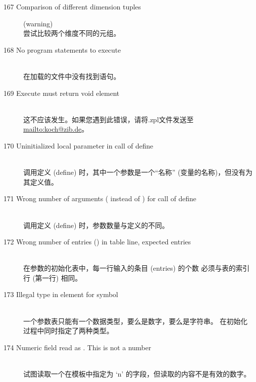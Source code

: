 \begin{description}
\item[167 Comparison of different dimension tuples] (warning)\ \\
  尝试比较两个维度不同的元组。
%
%
\item[168 No program statements to execute]\ \\
  在加载的文件中没有找到\zimpl 语句。
%
%
\item[169 Execute must return void element]\ \\
  这不应该发生。如果您遇到此错误，请将.zpl文件发送至\url{mailto:koch@zib.de}。
%
%
\item[170 Uninitialized local parameter  in call of
  define ]\ \\
  调用定义 (define) 时，其中一个参数是一个``名称''
  (变量的名称)，但没有为其定义值。
\item[171 Wrong number of arguments ( instead of )
  for call of define ]\ \\
  调用定义 (define) 时，参数数量与定义的不同。
\item[172 Wrong number of entries () in table line, 
  expected  entries]\ \\
  在参数的初始化表中，每一行输入的条目 (entries) 的个数
  必须与表的索引行 (第一行) 相同。
\item[173 Illegal type in element  for symbol]\ \\
  一个参数表只能有一个数据类型，要么是数字，要么是字符串。
  在初始化过程中同时指定了两种类型。
%
%
\item[174 Numeric field  read as . This is not a
  number]\ \\
  试图读取一个在模板中指定为 `n' 的字段，但读取的内容不是有效的数字。

\end{description}
